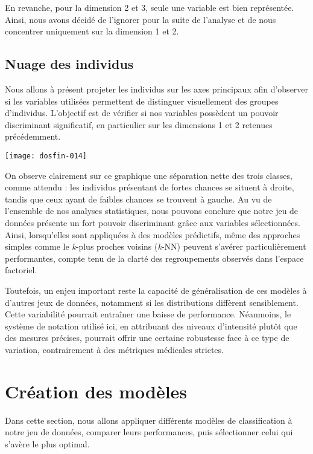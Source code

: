 \documentclass[a4paper,11pt]{article}
\begin{document}
En revanche, pour la dimension 2 et 3, seule une variable est bien représentée. Ainsi, nous avons décidé de l'ignorer pour la suite de l'analyse et de nous concentrer uniquement sur la dimension 1 et 2.

\newpage

\subsection{Nuage des individus}

Nous allons à présent projeter les individus sur les axes principaux afin d’observer si les variables utilisées permettent de distinguer visuellement des groupes d’individus. L’objectif est de vérifier si nos variables possèdent un pouvoir discriminant significatif, en particulier sur les dimensions 1 et 2 retenues précédemment.

\begin{center}
\texttt{[image: dosfin-014]}
\end{center}

On observe clairement sur ce graphique une séparation nette des trois classes, comme attendu : les individus présentant de fortes chances se situent à droite, tandis que ceux ayant de faibles chances se trouvent à gauche. Au vu de l’ensemble de nos analyses statistiques, nous pouvons conclure que notre jeu de données présente un fort pouvoir discriminant grâce aux variables sélectionnées. Ainsi, lorsqu’elles sont appliquées à des modèles prédictifs, même des approches simples comme le \textit{k}-plus proches voisins (\textit{k}-NN) peuvent s'avérer particulièrement performantes, compte tenu de la clarté des regroupements observés dans l’espace factoriel.

Toutefois, un enjeu important reste la capacité de généralisation de ces modèles à d’autres jeux de données, notamment si les distributions diffèrent sensiblement. Cette variabilité pourrait entraîner une baisse de performance. Néanmoins, le système de notation utilisé ici, en attribuant des niveaux d’intensité plutôt que des mesures précises, pourrait offrir une certaine robustesse face à ce type de variation, contrairement à des métriques médicales strictes.


\section{Création des modèles}

Dans cette section, nous allons appliquer différents modèles de classification à notre jeu de données, comparer leurs performances, puis sélectionner celui qui s’avère le plus optimal.
\end{document}
